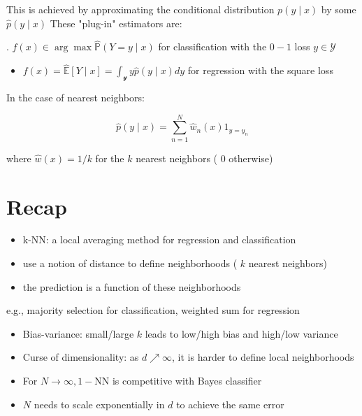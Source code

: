 This is achieved by approximating the conditional distribution $p(y \mid x)$ by some $\hat{p}(y \mid x)$ These "plug-in" estimators are:

. $f(x) \in \arg \max \hat{\mathbb{P}}(Y=y \mid x)$ for classification with the $0-1$ loss $y \in \mathcal{Y}$

\begin{itemize}
  \item $f(x)=\hat{\mathbb{E}}[Y \mid x]=\int_{\mathscr{y}} y \hat{p}(y \mid x) d y$ for regression with the square loss
\end{itemize}

In the case of nearest neighbors:

$$
\hat{p}(y \mid x)=\sum_{n=1}^{N} \hat{w}_{n}(x) 1_{y=y_{n}}
$$

where $\hat{w}(x)=1 / k$ for the $k$ nearest neighbors ( 0 otherwise)

\section*{Recap}
\begin{itemize}
  \item k-NN: a local averaging method for regression and classification
  \item use a notion of distance to define neighborhoods ( $k$ nearest neighbors)
  \item the prediction is a function of these neighborhoods
\end{itemize}

e.g., majority selection for classification, weighted sum for regression

\begin{itemize}
  \item Bias-variance: small/large $k$ leads to low/high bias and high/low variance

  \item Curse of dimensionality: as $d \nearrow \infty$, it is harder to define local neighborhoods

  \item For $N \rightarrow \infty, 1-\mathrm{NN}$ is competitive with Bayes classifier

  \item $N$ needs to scale exponentially in $d$ to achieve the same error

\end{itemize}